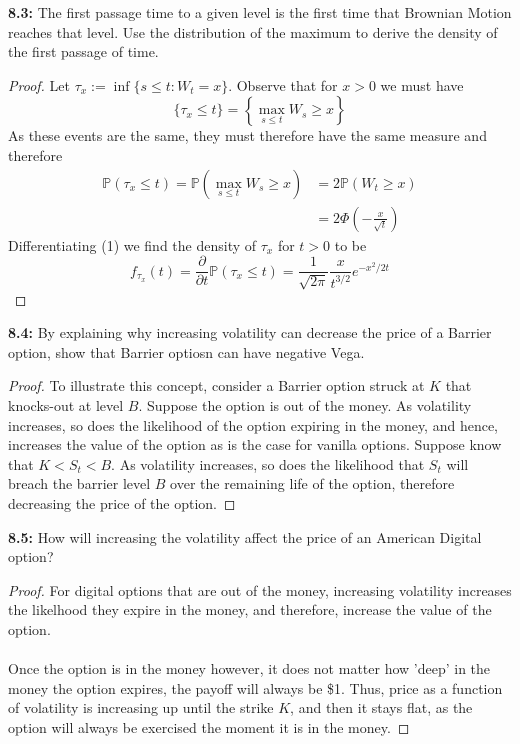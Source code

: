 \documentclass{article}
\begin{document}
\begin{tcolorbox}[colframe=black,colback=gray!5,boxrule=0.5pt]
\textbf{8.3:} The first passage time to a given level is the first time that Brownian Motion reaches that level. Use the distribution of the maximum to derive the density of the first passage of time. 
\end{tcolorbox}
\begin{proof}
    Let $\tau_x := \inf \{s\leq t: W_t = x\}$. Observe that for $x > 0$ we must have 
    $$\{\tau_x\leq t\} = \left\{\max_{s\leq t}W_s\geq x\right\}$$
    As these events are the same, they must therefore have the same measure and therefore
    \begin{align*}
        \mathbb{P}(\tau_x\leq t) = \mathbb{P}\left(\max_{s\le t} W_s\geq x\right) &= 2\mathbb{P}(W_t\geq x) \tag{Reflection Principal} \\
        &= 2\Phi\left(-\frac{x}{\sqrt{t}}\right) \tag{1}
    \end{align*}
    Differentiating (1) we find the density of $\tau_x$ for $t>0$ to be
    $$f_{\tau_x}(t) = \frac{\partial}{\partial t} \mathbb{P}(\tau_x\leq t) = \frac{1}{\sqrt{2\pi}}\frac{x}{t^{3/2}}e^{-x^2/2t}$$
\end{proof}




\begin{tcolorbox}[colframe=black,colback=gray!5,boxrule=0.5pt]
\textbf{8.4:} By explaining why increasing volatility can decrease the price of a Barrier option, show that Barrier optiosn can have negative Vega.
\end{tcolorbox}
\begin{proof}
    To illustrate this concept, consider a Barrier option struck at $K$ that knocks-out at level $B$. Suppose the option is out of the money. As volatility increases, so does the likelihood of the option expiring in the money, and hence, increases the value of the option as is the case for vanilla options. Suppose know that $K < S_t < B$. As volatility increases, so does the likelihood that $S_t$ will breach the barrier level $B$ over the remaining life of the option, therefore decreasing the price of the option.
\end{proof}

\begin{tcolorbox}[colframe=black,colback=gray!5,boxrule=0.5pt]
\textbf{8.5:} How will increasing the volatility affect the price of an American Digital option?
\end{tcolorbox}
\begin{proof}
    For digital options that are out of the money, increasing volatility increases the likelhood they expire in the money, and therefore, increase the value of the option. \\
    \\
    Once the option is in the money however, it does not matter how 'deep' in the money the option expires, the payoff will always be \$1. Thus, price as a function of volatility is increasing up until the strike $K$, and then it stays flat, as the option will always be exercised the moment it is in the money.
\end{proof}
\end{document}
